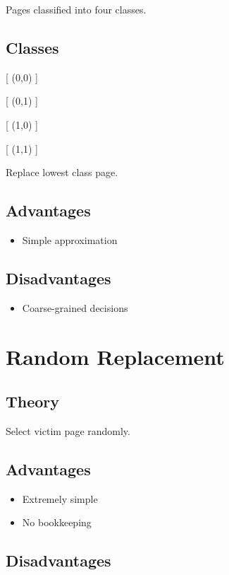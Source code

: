 Pages classified into four classes.

\subsection{Classes}

[
(0,0)
]

[
(0,1)
]

[
(1,0)
]

[
(1,1)
]

Replace lowest class page.

\subsection{Advantages}

\begin{itemize}
\item Simple approximation
\end{itemize}

\subsection{Disadvantages}

\begin{itemize}
\item Coarse-grained decisions
\end{itemize}

\section{Random Replacement}

\subsection{Theory}

Select victim page randomly.

\subsection{Advantages}

\begin{itemize}
\item Extremely simple
\item No bookkeeping
\end{itemize}

\subsection{Disadvantages}

